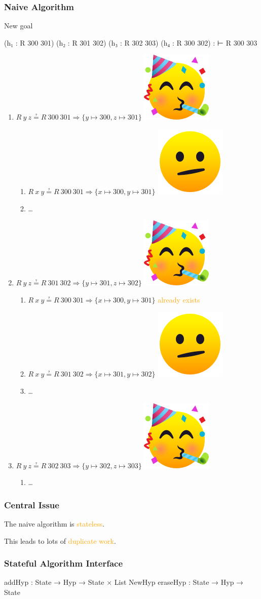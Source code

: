 \documentclass[xetex]{beamer}
\newlength{\emojiheight}
\newcommand{\good}{\includegraphics[height=\emojiheight]{images/1f973}}
\newcommand{\bad}{\includegraphics[height=\emojiheight]{images/1fae4}}
\newcommand{\orange}[1]{\textcolor{orange}{#1}}
\begin{document}
\begin{frame}[fragile]
  \frametitle{Naive Algorithm}

  \begin{block}{New goal}
    \begin{leancode}
        (h₁ : R 300 301)
        (h₂ : R 301 302)
        (h₃ : R 302 303)
        (h₄ : R 300 302) :
        ⊢ R 300 303
    \end{leancode}
  \end{block}
\end{frame}

\begin{frame}
  \begin{enumerate}[<+->]
    \item $R~y~z ≟ R~300~301 ⇒ \{y ↦ 300, z ↦ 301\}$ \good
          \begin{enumerate}[<+->]
            \item $R~x~y ≟ R~300~301 ⇒ \{x ↦ 300, y ↦ 301\}$ \bad
            \item \dots
          \end{enumerate}
    \item $R~y~z ≟ R~301~302 ⇒ \{y ↦ 301, z ↦ 302\}$ \good
          \begin{enumerate}[<+->]
            \item $R~x~y ≟ R~300~301 ⇒ \{x ↦ 300, y ↦ 301\}$ \orange{already exists}
            \item $R~x~y ≟ R~301~302 ⇒ \{x ↦ 301, y ↦ 302\}$ \bad
            \item \dots
          \end{enumerate}
    \item $R~y~z ≟ R~302~303 ⇒ \{y ↦ 302, z ↦ 303\}$ \good
          \begin{enumerate}
            \item \dots
          \end{enumerate}
  \end{enumerate}
\end{frame}

\begin{frame}
  \frametitle{Central Issue}

  The naive algorithm is \orange{stateless}.

  This leads to lots of \orange{duplicate work}.
\end{frame}

\begin{frame}[fragile]
  \frametitle{Stateful Algorithm Interface}

  \begin{leancode}
    addHyp   : State → Hyp → State × List NewHyp
    eraseHyp : State → Hyp → State
  \end{leancode}
\end{frame}
\end{document}
